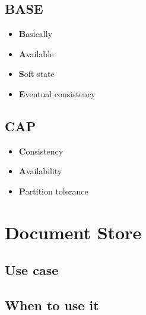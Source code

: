 \documentclass{CRPITStyle}
\renewcommand{\cite}{\citep}
\begin{document}
\subsection{BASE}

\cite{base}

\begin{itemize}
    \item \textbf{B}asically
    \item \textbf{A}vailable
    \item \textbf{S}oft state
    \item \textbf{E}ventual consistency
\end{itemize}



\subsection{CAP}

\begin{itemize}
    \item \textbf{C}onsistency
    \item \textbf{A}vailability
    \item \textbf{P}artition tolerance
\end{itemize}




\section{Document Store}


\subsection{Use case}

\subsection{When to use it}
\end{document}
